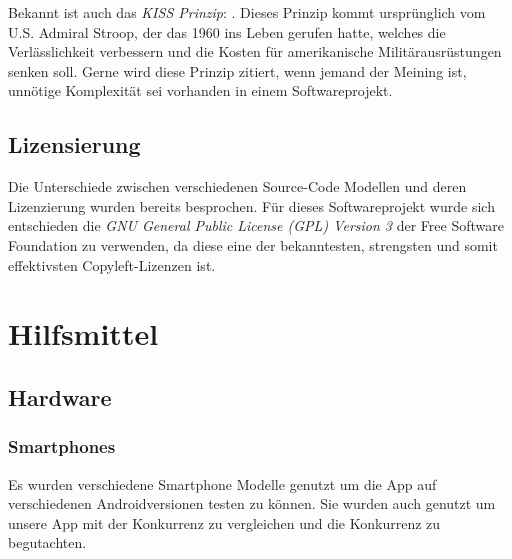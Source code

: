 \documentclass[a4paper,11pt]{article}
\begin{document}
Bekannt ist auch das \textit{KISS Prinzip}: . Dieses Prinzip kommt ursprünglich vom U.S. Admiral Stroop, der das  1960 ins Leben gerufen hatte, welches die Verlässlichkeit verbessern und die Kosten für amerikanische Militärausrüstungen senken soll. \cite{dalzell2009} Gerne wird diese Prinzip zitiert, wenn jemand der Meining ist, unnötige Komplexität sei vorhanden in einem Softwareprojekt.

\subsection{Lizensierung}

Die Unterschiede zwischen verschiedenen Source-Code Modellen und deren Lizenzierung wurden bereits besprochen. Für dieses Softwareprojekt wurde sich entschieden die \textit{GNU General Public License (GPL) Version 3} \cite{GPLv3} der Free Software Foundation zu verwenden, da diese eine der bekanntesten, strengsten und somit effektivsten Copyleft-Lizenzen ist.

\section{Hilfsmittel}

\subsection{Hardware}

\subsubsection{Smartphones}

Es wurden verschiedene Smartphone Modelle genutzt um die App auf verschiedenen Androidversionen testen zu können. Sie wurden auch genutzt um unsere App mit der Konkurrenz zu vergleichen und die 
Konkurrenz zu begutachten. 
\end{document}
